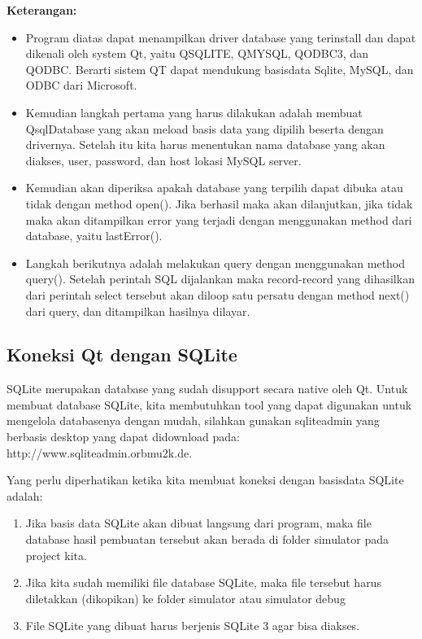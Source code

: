 \textbf{Keterangan:}

\begin{itemize}

\item
  Program diatas dapat menampilkan driver database yang terinstall dan
  dapat dikenali oleh system Qt, yaitu QSQLITE, QMYSQL, QODBC3, dan
  QODBC. Berarti sistem QT dapat mendukung basisdata Sqlite, MySQL, dan
  ODBC dari Microsoft.
\item
  Kemudian langkah pertama yang harus dilakukan adalah membuat
  QsqlDatabase yang akan meload basis data yang dipilih beserta dengan
  drivernya. Setelah itu kita harus menentukan nama database yang akan
  diakses, user, password, dan host lokasi MySQL server.
\item
  Kemudian akan diperiksa apakah database yang terpilih dapat dibuka
  atau tidak dengan method open(). Jika berhasil maka akan dilanjutkan,
  jika tidak maka akan ditampilkan error yang terjadi dengan menggunakan
  method dari database, yaitu lastError().
\item
  Langkah berikutnya adalah melakukan query dengan menggunakan method
  query(). Setelah perintah SQL dijalankan maka record-record yang
  dihasilkan dari perintah select tersebut akan diloop satu persatu
  dengan method next() dari query, dan ditampilkan hasilnya dilayar.
\end{itemize}

\subsection{Koneksi Qt dengan SQLite}\label{koneksi-qt-dengan-sqlite}

SQLite merupakan database yang sudah disupport secara native oleh Qt.
Untuk membuat database SQLite, kita membutuhkan tool yang dapat
digunakan untuk mengelola databasenya dengan mudah, silahkan gunakan
sqliteadmin yang berbasis desktop yang dapat didownload pada:
http://www.sqliteadmin.orbmu2k.de.

Yang perlu diperhatikan ketika kita membuat koneksi dengan basisdata
SQLite adalah:

\begin{enumerate}


\item
  Jika basis data SQLite akan dibuat langsung dari program, maka file
  database hasil pembuatan tersebut akan berada di folder simulator pada
  project kita.
\item
  Jika kita sudah memiliki file database SQLite, maka file tersebut
  harus diletakkan (dikopikan) ke folder simulator atau simulator \textfractionsolidus debug
\item
  File SQLite yang dibuat harus berjenis SQLite 3 agar bisa diakses.
\end{enumerate}

